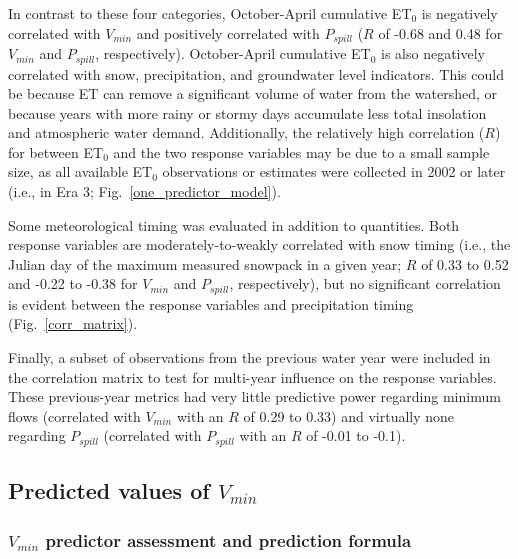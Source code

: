 \documentclass[hess, manuscript]{copernicus}
\begin{document}
In contrast to these four categories, October-April cumulative
ET$_\mathrm{0}$ is negatively correlated with $V_{min}$ and
positively correlated with $P_{spill}$ ($R$ of -0.68 and 0.48 for
$V_{min}$ and $P_{spill}$, respectively). October-April cumulative
ET$_\mathrm{0}$ is also negatively correlated with snow,
precipitation, and groundwater level indicators. This could be because
ET can remove a significant volume of water from the watershed, or
because years with more rainy or stormy days accumulate less total
insolation and atmospheric water demand. Additionally, the relatively
high correlation ($R$) for between ET$_\mathrm{0}$ and the two
response variables may be due to a small sample size, as all available
ET$_\mathrm{0}$ observations or estimates were collected in 2002 or
later (i.e., in Era 3; Fig.~\ref{one_predictor_model}).

Some meteorological timing was evaluated in addition to quantities. Both
response variables are moderately-to-weakly correlated with snow timing
(i.e., the Julian day of the maximum measured snowpack in a given year;
$R$ of 0.33 to 0.52 and -0.22 to -0.38 for $V_{min}$ and
$P_{spill}$, respectively), but no significant correlation is evident
between the response variables and precipitation timing
(Fig.~\ref{corr_matrix}).

Finally, a subset of observations from the previous water year were
included in the correlation matrix to test for multi-year influence on
the response variables. These previous-year metrics had very little
predictive power regarding minimum flows (correlated with $V_{min}$
with an $R$ of 0.29 to 0.33) and virtually none regarding
$P_{spill}$ (correlated with $P_{spill}$ with an $R$ of -0.01 to
-0.1).

\subsection{\texorpdfstring{Predicted values of
$V_{min}$}{Predicted values of V\_\{min\}}}

\subsubsection{\texorpdfstring{$V_{min}$ predictor assessment and
prediction
formula}{V\_\{min\} predictor assessment and prediction formula}}
\end{document}
